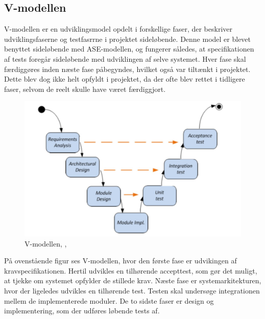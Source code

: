 \subsection{V-modellen}
V-modellen er en udviklingsmodel opdelt i forskellige faser, der beskriver udviklingsfaserne og testfasrrne i projektet sideløbende. Denne model er blevet benyttet sideløbende med ASE-modellen, og fungerer således, at specifikationen af tests foregår sideløbende med udviklingen af selve systemet. Hver fase skal færdiggøres inden næste fase påbegyndes, hvilket også var tiltænkt i projektet. Dette blev dog ikke helt opfyldt i projektet, da der ofte blev rettet i tidligere faser, selvom de reelt skulle have været færdiggjort.
\begin{figure}[H]
	\centering
	\includegraphics[width=1\textwidth]{Figurer/vmodel}
	\caption{V-modellen, \protect\cite[s. 4]{Vejledning}, \protect\cite{ISE}}
\end{figure}
På ovenstående figur ses V-modellen, hvor den første fase er udvikingen af kravspecifikationen. Hertil udvikles en tilhørende accepttest, som gør det muligt, at tjekke om systemet opfylder de stillede krav. Næste fase er systemarkitekturen, hvor der ligeledes udvikles en tilhørende test. Testen skal undersøge integrationen mellem de implementerede moduler. De to sidste faser er design og implementering, som der udføres løbende tests af. 

